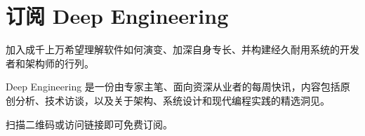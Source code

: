 \section*{订阅 Deep Engineering}

加入成千上万希望理解软件如何演变、加深自身专长、并构建经久耐用系统的开发者和架构师的行列。

Deep Engineering 是一份由专家主笔、面向资深从业者的每周快讯，内容包括原创分析、技术访谈，以及关于架构、系统设计和现代编程实践的精选洞见。

扫描二维码或访问链接即可免费订阅。

